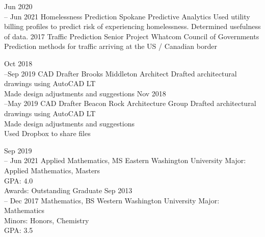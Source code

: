 \documentclass[11pt]{developercv} %
\begin{document}
\begin{entrylist}
	\entry
	    {Jun 2020 \\
		-- Jun 2021}
	    {Homelessness Prediction}
	    {Spokane Predictive Analytics}
	    {Used utility billing profiles to predict risk of experiencing homelessness. Determined usefulness of data.}
	\entry
		{2017}
		{Traffic Prediction Senior Project}
		{Whatcom Council of Governments}
		{Prediction methods for traffic arriving at the US / Canadian border}
\end{entrylist}


\begin{entrylist}
	\entry
		{Oct 2018 \\
		--Sep 2019}
		{CAD Drafter}
		{Brooks Middleton Architect}
		{Drafted architectural drawings using AutoCAD LT \\ 
		Made design adjustments and suggestions}
	\entry
		{Nov 2018 \\
		--May 2019}
		{CAD Drafter}
		{Beacon Rock Architecture Group}
		{Drafted architectural drawings using AutoCAD LT \\ 
		Made design adjustments and suggestions \\
		Used Dropbox to share files}
\end{entrylist}



\begin{entrylist}
	\entry
		{Sep 2019\\
		-- Jun 2021}
		{Applied Mathematics, MS}
		{Eastern Washington University}
		{Major: Applied Mathematics, Masters \\
		GPA: 4.0 \\
		Awards: Outstanding Graduate
		}
	\entry
		{Sep 2013\\
		-- Dec 2017}
		{Mathematics, BS}
		{Western Washington University}
		{Major: Mathematics \\
		Minors: Honors, Chemistry \\
		GPA: 3.5
		}
\end{entrylist}
\end{document}

